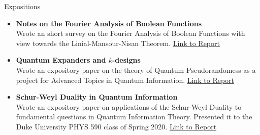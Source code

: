 \documentclass{resume} %
\begin{document}
\begin{rSection}{Expositions}
  \begin{itemize}
    \item {\bf Notes on the Fourier Analysis of Boolean Functions}
    \hfill \\
    Wrote an short survey on the Fourier Analysis of Boolean Functions with view towards the Linial-Mansour-Nisan Theorem.
    \href{https://github.com/ekim1919/Research/blob/master/CS590/EdwardKimPaper.pdf}{Link to Report}
    \item {\bf Quantum Expanders and $k$-designs} \hfill \\
    Wrote an expository paper on the theory of Quantum Pseudorandomess as a project for Advanced Topics in Quantum Information.
    \href{https://github.com/ekim1919/Research/blob/master/PHYS790/final.pdf}{Link to Report}
    \item{\bf  Schur-Weyl Duality in Quantum Information} \hfill \\
    Wrote an expository paper on applications of the Schur-Weyl Duality to fundamental questions in Quantum Information Theory. Presented it to the Duke University PHYS 590 class of Spring 2020.
\href{https://github.com/ekim1919/Research/blob/master/P590/final.pdf}{Link to Report}
  \end{itemize}
\end{rSection}
\end{document}
